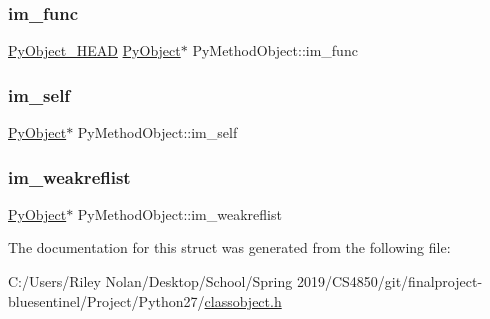\mbox{\label{struct_py_method_object_a94a16dd58736bda5aff3a5441de6fd40}} 
\subsubsection{\texorpdfstring{im\_func}{im\_func}}
{\footnotesize\ttfamily \mbox{\hyperlink{_python27_2object_8h_a0bf35c1f3ea13f925de94d8593db3b7e}{Py\+Object\+\_\+\+H\+E\+AD}} \mbox{\hyperlink{_python27_2object_8h_aadc84ac7aed2cfa6f20c25f62bf3dac7}{Py\+Object}}$\ast$ Py\+Method\+Object\+::im\+\_\+func}

\mbox{\label{struct_py_method_object_ab269f412ca4beb02b3c3c08ba1732ba5}} 
\subsubsection{\texorpdfstring{im\_self}{im\_self}}
{\footnotesize\ttfamily \mbox{\hyperlink{_python27_2object_8h_aadc84ac7aed2cfa6f20c25f62bf3dac7}{Py\+Object}}$\ast$ Py\+Method\+Object\+::im\+\_\+self}

\mbox{\label{struct_py_method_object_a723bb6933db81c59f188d65d3156101d}} 
\subsubsection{\texorpdfstring{im\_weakreflist}{im\_weakreflist}}
{\footnotesize\ttfamily \mbox{\hyperlink{_python27_2object_8h_aadc84ac7aed2cfa6f20c25f62bf3dac7}{Py\+Object}}$\ast$ Py\+Method\+Object\+::im\+\_\+weakreflist}



The documentation for this struct was generated from the following file\+:\begin{DoxyCompactItemize}
\item 
C\+:/\+Users/\+Riley Nolan/\+Desktop/\+School/\+Spring 2019/\+C\+S4850/git/finalproject-\/bluesentinel/\+Project/\+Python27/\mbox{\hyperlink{classobject_8h}{classobject.\+h}}\end{DoxyCompactItemize}
